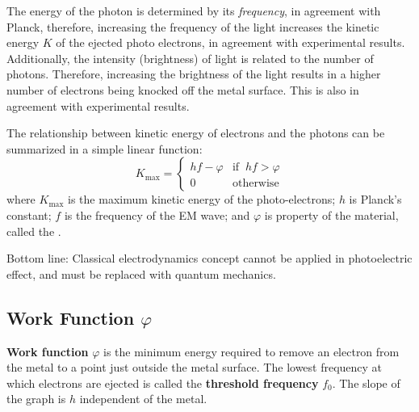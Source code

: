 The energy of the photon is determined by its \emph{frequency}, in agreement
with Planck, therefore, increasing the frequency of the light increases the
kinetic energy $K$ of the ejected photo electrons, in agreement with
experimental results. Additionally, the intensity (brightness) of light is
related to the number of photons. Therefore, increasing the brightness of
the light results in a higher number of electrons being knocked off the metal
surface. This is also in agreement with experimental results.

The relationship between kinetic energy of electrons and the photons can be
summarized in a simple linear function:
\begin{equation}
  \boxed{
    K_\text{max}=
    \begin{cases}
      hf-\varphi & \text{if}\;\;hf>\varphi\\
      0          & \text{otherwise}
    \end{cases}
  }
\end{equation}
where $K_\text{max}$ is the maximum kinetic energy of the photo-electrons; $h$
is Planck's constant; $f$ is the frequency of the EM wave; and $\varphi$ is
property of the material, called the .



Bottom line: Classical electrodynamics concept cannot
be applied in photoelectric effect, and must be replaced with quantum
mechanics.




\subsection{Work Function $\varphi$}

\textbf{Work function} $\varphi$ is the minimum energy required to remove
an electron from the metal to a point just outside the metal surface. The
lowest frequency at which electrons are ejected is called the
\textbf{threshold frequency} $f_0$. The slope of the graph is $h$ independent
of the metal.

